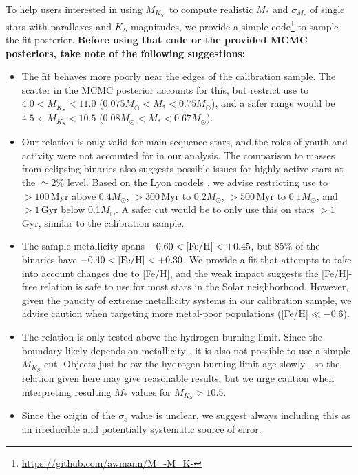 \documentclass[twocolumn]{aastex62}
\newcommand{\mks}{$M_{K_S}$}
\begin{document}
To help users interested in using \mks\ to compute realistic $M_*$ and $\sigma_{M_*}$ of single stars with parallaxes and $K_S$ magnitudes, we provide a simple code\footnote{\href{https://github.com/awmann/M_-M_K-}{https://github.com/awmann/M\_-M\_K-}} to sample the fit posterior. {\bf Before using that code or the provided MCMC posteriors, take note of the following suggestions:}
\begin{itemize}
\item The fit behaves more poorly near the edges of the calibration sample. The scatter in the MCMC posterior accounts for this, but restrict use to $4.0<M_{K_S}<11.0$ ($0.075M_\odot<M_*<0.75M_\odot$), and a safer range would be $4.5<M_{K_S}<10.5$ ($0.08M_\odot<M_*<0.67M_\odot$). 

\item Our relation is only valid for main-sequence stars, and the roles of youth and activity were not accounted for in our analysis. The comparison to masses from eclipsing binaries also suggests possible issues for highly active stars at the $\simeq$2\% level. Based on the Lyon models \citep{BHAC15}, we advise restricting use to $>100$\,Myr above $0.4M_\odot$, $>300$\,Myr to $0.2M_\odot$, $>500$\,Myr to $0.1M_\odot$, and $>1$\,Gyr below 0.1$M_\odot$. A safer cut would be to only use this on stars $>1$ Gyr, similar to the calibration sample.

\item The sample metallicity spans $-0.60<\rm{[Fe/H]}<+0.45$, but 85\% of the binaries have $-0.40<\rm{[Fe/H]}<+0.30$. We provide a fit that attempts to take into account changes due to [Fe/H], and the weak impact suggests the [Fe/H]-free relation is safe to use for most stars in the Solar neighborhood. However, given the paucity of extreme metallicity systems in our calibration sample, we advise caution when targeting more metal-poor populations ([Fe/H]$\ll-0.6$). 

\item The relation is only tested above the hydrogen burning limit. Since the boundary likely depends on metallicity \citep{2001RvMP...73..719B}, it is also not possible to use a simple $M_{K_S}$ cut. Objects just below the hydrogen burning limit age slowly \citep{BHAC15}, so the relation given here may give reasonable results, but we urge caution when interpreting resulting $M_*$ values for $M_{K_S}>10.5$. 

\item Since the origin of the $\sigma_e$ value is unclear, we suggest always including this as an irreducible and potentially systematic source of error. 

\end{itemize}
\end{document}

